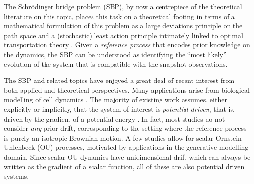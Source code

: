 \documentclass{article}
\theoremstyle{newstyle}
\begin{document}
The Schr\"odinger bridge problem (SBP), by now a centrepiece of the theoretical literature on this topic, places this task on a  theoretical footing in terms of a  mathematical formulation of this problem as a large deviations principle on the path space \cite{leonard2013survey} and a (stochastic) least action principle intimately linked to optimal transportation theory \cite{chen2021stochastic}. Given a \emph{reference process} that encodes prior knowledge on the dynamics, the SBP can be understood as identifying the ``most likely'' evolution of the system that is compatible with the snapshot observations. 

The SBP and related topics have enjoyed a great deal of recent interest from both applied and theoretical perspectives. Many applications arise from biological modelling of cell dynamics \cite{bunne2024optimal, schiebinger2021reconstructing}. The majority of existing work assumes, either explicitly or implicitly, that the system of interest is \emph{potential driven}, that is, driven by the gradient of a potential energy \cite{lavenant2021towards, chizat2022trajectory, tong2023simulation, bunne2023schrodinger, tong2020trajectorynet, yeo2021generative, bunne2022proximal}.
In fact, most studies do not consider \emph{any} prior drift, corresponding to the setting where the reference process is purely an isotropic Brownian motion. A few studies \cite{bunne2023schrodinger, shi2023diffusion, de2021diffusion} allow for scalar Ornstein-Uhlenbeck (OU) processes, motivated by applications in the generative modelling domain. Since scalar OU dynamics have unidimensional drift which can always be written as the gradient of a scalar function, all of these are also potential driven systems.
\end{document}
